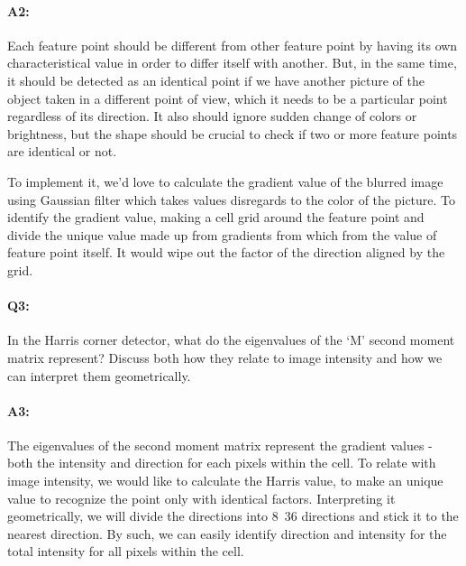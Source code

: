 \paragraph{A2:} Each feature point should be different from other feature point by having its own characteristical value in order to differ itself with another. But, in the same time, it should be detected as an identical point if we have another picture of the object taken in a different point of view, which it needs to be a particular point regardless of its direction. It also should ignore sudden change of colors or brightness, but the shape should be crucial to check if two or more feature points are identical or not.

To implement it, we'd love to calculate the gradient value of the blurred image using Gaussian filter which takes values disregards to the color of the picture. To identify the gradient value, making a cell grid around the feature point and divide the unique value made up from gradients from which from the value of feature point itself. It would wipe out the factor of the direction aligned by the grid.




\pagebreak
\paragraph{Q3:} In the Harris corner detector, what do the eigenvalues of the `M' second moment matrix represent? Discuss both how they relate to image intensity and how we can interpret them geometrically.

\paragraph{A3:} The eigenvalues of the second moment matrix represent the gradient values - both the intensity and direction for each pixels within the cell. To relate with image intensity, we would like to calculate the Harris value, to make an unique value to recognize the point only with identical factors. Interpreting it geometrically, we will divide the directions into 8~36 directions and stick it to the nearest direction. By such, we can easily identify direction and intensity for the total intensity for all pixels within the cell.



